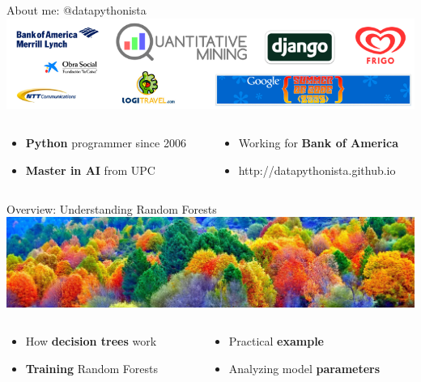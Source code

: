 \begin{frame}{About me: @datapythonista}
    \includegraphics[scale=.5]{images/about_me}

    \begin{columns}
     \begin{column}{.49\textwidth}
        \begin{itemize}
            \Large
            \item \textbf{Python} programmer since 2006
            \item \textbf{Master in AI} from UPC
        \end{itemize}
     \end{column}
    
     \begin{column}{.49\textwidth}
        \begin{itemize}
            \Large
            \item Working for \textbf{Bank of America}
            \item http://datapythonista.github.io
        \end{itemize}
     \end{column}
    \end{columns}
\end{frame}


\begin{frame}{Overview: Understanding Random Forests}
    \includegraphics[scale=.9]{images/trees_colors}

    \begin{columns}
     \begin{column}{.49\textwidth}
        \begin{itemize}
            \Large
            \item How \textbf{decision trees} work
            \item \textbf{Training} Random Forests
        \end{itemize}
     \end{column}
    
     \begin{column}{.49\textwidth}
        \begin{itemize}
            \Large
            \item Practical \textbf{example}
            \item Analyzing model \textbf{parameters}
        \end{itemize}
     \end{column}
    \end{columns}
\end{frame}


